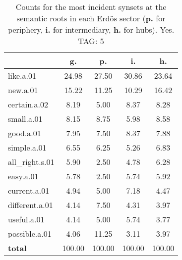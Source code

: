 \begin{table}[h!]
\begin{center}
\begin{tabular}{| l | c | c | c | c |}\hline
 & g. & p. & i. & h. \\\hline
like.a.01 & 24.98  & 27.50  & 30.86  & 23.64 \\\hline
new.a.01 & 15.22  & 11.25  & 10.29  & 16.42 \\\hline
certain.a.02 & 8.19  & 5.00  & 8.37  & 8.28 \\\hline
small.a.01 & 8.15  & 8.75  & 5.98  & 8.58 \\\hline
good.a.01 & 7.95  & 7.50  & 8.37  & 7.88 \\\hline
simple.a.01 & 6.55  & 6.25  & 5.26  & 6.83 \\\hline
all\_right.s.01 & 5.90  & 2.50  & 4.78  & 6.28 \\\hline
easy.a.01 & 5.78  & 2.50  & 5.74  & 5.92 \\\hline
current.a.01 & 4.94  & 5.00  & 7.18  & 4.47 \\\hline
different.a.01 & 4.14  & 7.50  & 4.31  & 3.97 \\\hline
useful.a.01 & 4.14  & 5.00  & 5.74  & 3.77 \\\hline
possible.a.01 & 4.06  & 11.25  & 3.11  & 3.97 \\\hline
{{\bf total}} & 100.00  & 100.00  & 100.00  & 100.00 \\\hline
\end{tabular}
\caption{Counts for the most incident synsets at the semantic roots in each Erd\"os sector ({\bf p.} for periphery, {\bf i.} for intermediary, {\bf h.} for hubs). Yes. TAG: 5}
\end{center}
\end{table}